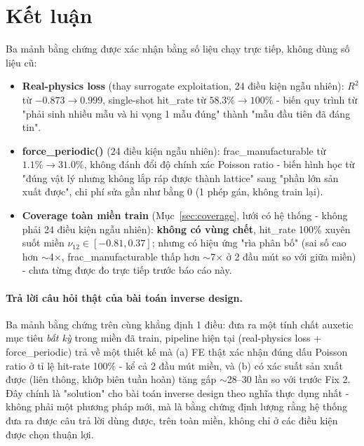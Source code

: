 \documentclass[11pt,a4paper]{article}
\begin{document}
\section{Kết luận}
Ba mảnh bằng chứng được xác nhận bằng số liệu chạy trực tiếp, không dùng số liệu cũ:

\begin{itemize}[leftmargin=1.4em]
  \item \textbf{Real-physics loss} (thay surrogate exploitation, 24 điều kiện ngẫu nhiên):
  $R^2$ từ $-0.873\to0.999$, single-shot hit\_rate từ $58.3\%\to100\%$ - biến quy trình từ "phải
  sinh nhiều mẫu và hi vọng 1 mẫu đúng" thành "mẫu đầu tiên đã đáng tin".
  \item \textbf{force\_periodic()} (24 điều kiện ngẫu nhiên): frac\_manufacturable từ
  $1.1\%\to31.0\%$, không đánh đổi độ chính xác Poisson ratio - biến hình học từ "đúng vật lý
  nhưng không lắp ráp được thành lattice" sang "phần lớn sản xuất được", chi phí sửa gần như bằng
  0 (1 phép gán, không train lại).
  \item \textbf{Coverage toàn miền train} (Mục~\ref{sec:coverage}, lưới có hệ thống - không phải
  24 điều kiện ngẫu nhiên): \textbf{không có vùng chết}, hit\_rate 100\% xuyên suốt miền
  $\nu_{12}\in[-0.81,0.37]$; nhưng có hiệu ứng "rìa phân bố" (sai số cao hơn $\sim$4$\times$,
  frac\_manufacturable thấp hơn $\sim$7$\times$ ở 2 đầu mút so với giữa miền) - chưa từng được đo
  trực tiếp trước báo cáo này.
\end{itemize}

\paragraph{Trả lời câu hỏi thật của bài toán inverse design.} Ba mảnh bằng chứng trên cùng khẳng
định 1 điều: đưa ra một tính chất auxetic mục tiêu \emph{bất kỳ} trong miền đã train, pipeline
hiện tại (real-physics loss + force\_periodic) trả về một thiết kế mà (a) FE thật xác nhận đúng
dấu Poisson ratio ở tỉ lệ hit-rate 100\% - kể cả 2 đầu mút miền, và (b) có xác suất
sản xuất được (liên thông, khớp biên tuần hoàn) tăng gấp $\sim$28--30 lần so với trước Fix 2. Đây
chính là "solution" cho bài toán inverse design theo nghĩa thực dụng nhất - không phải một
phương pháp mới, mà là bằng chứng định lượng rằng hệ thống đưa ra được câu trả lời dùng được, trên
toàn miền, không chỉ ở các điều kiện được chọn thuận lợi.
\end{document}
